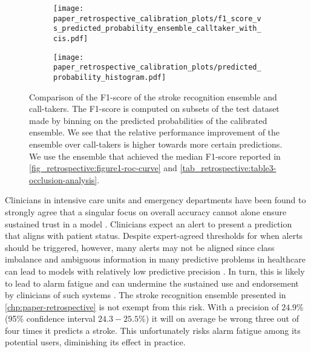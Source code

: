 
\begin{figure}[t!]
    \centering
    \begin{subfigure}[c]{0.49\columnwidth}
        \centering
        \texttt{[image: paper\_retrospective\_calibration\_plots/f1\_score\_vs\_predicted\_probability\_ensemble\_calltaker\_with\_cis.pdf]}
    \end{subfigure}
    \hfill
    \begin{subfigure}[c]{0.49\columnwidth}
        \centering
        \texttt{[image: paper\_retrospective\_calibration\_plots/predicted\_probability\_histogram.pdf]}
    \end{subfigure}    
    \caption[Comparison of F1-score of stroke recognition ensemble and call-takers as function of predicted probability.]{ Comparison of the F1-score of the stroke recognition ensemble and call-takers. The F1-score is computed on subsets of the test dataset made by binning on the predicted probabilities of the calibrated ensemble. We see that the relative performance improvement of the ensemble over call-takers is higher towards more certain predictions. We use the ensemble that achieved the median F1-score reported in \cref{fig_retrospective:figure1-roc-curve} and \cref{tab_retrospective:table3-occlusion-analysis}.}
    \label{fig_discussion:retrospective-paper-f1-performance-vs-predicted-probability}
\end{figure}

Clinicians in intensive care units and emergency departments have been found to strongly agree that a singular focus on overall accuracy cannot alone ensure sustained trust in a model \cite{tonekaboni_what_2019}. Clinicians expect an alert to present a prediction that aligns with patient status. Despite expert-agreed thresholds for when alerts should be triggered, however, many alerts may not be aligned since class imbalance and ambiguous information in many predictive problems in healthcare can lead to models with relatively low predictive precision \parencite{umscheid_development_2015, cite14, cite15, wenstrup_retrospective_2023}. In turn, this is likely to lead to alarm fatigue \parencite{embi_evaluating_2012} and can undermine the sustained use and endorsement by clinicians of such systems \parencite{guidi_clinician_2015}. 
The stroke recognition ensemble presented in \cref{chp:paper-retrospective} is not exempt from this risk. With a precision of $24.9\%$ (95\% confidence interval $24.3-25.5\%$) it will on average be wrong three out of four times it predicts a stroke. This unfortunately risks alarm fatigue among its potential users, diminishing its effect in practice.


